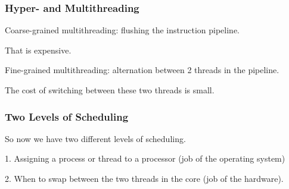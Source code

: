 \begin{frame}
\frametitle{Hyper- and Multithreading}

Coarse-grained multithreading: flushing the instruction pipeline. 

That is expensive. 

Fine-grained multithreading: alternation between 2 threads in the pipeline. 

The cost of switching between these two threads is small.

\end{frame}

\begin{frame}
\frametitle{Two Levels of Scheduling}

So now we have two different levels of scheduling.

1. Assigning a process or thread to a processor (job of the operating system)

2. When to swap between the two threads in the core (job of the hardware). 

\end{frame}




